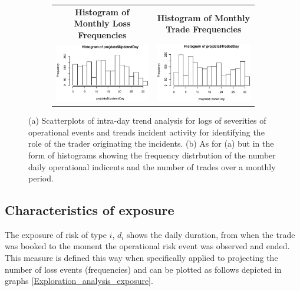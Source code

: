 \documentclass[]{DissertateUSU}
\begin{document}
\begin{figure}
\begin{subfigure}[b]{0.55\textwidth}
   \begin{frame}
      \centering
       \begin{tabular}{cc}
        \textbf{Histogram of Monthly Loss Frequencies} & \textbf{Histogram of Monthly Trade Frequencies} \\
        \includegraphics[width=7.5cm]{UpdatedDayFreq.eps}
         &
         \includegraphics[width=7cm]{TradedDayFreq.eps}
         \end{tabular}
    \end{frame}
   \label{Hist_Loss_Freq}
\end{subfigure}
\caption[Numerical grid display]{(a) Scatterplots of intra-day trend analysis for logs of severities of operational events and trends incident activity for identifying the role of the trader originating the incidents. (b) As for (a) but in the form of histograms showing the frequency distrbution of the number daily operational indicents and the number of trades over a monthly period.} 
\end{figure}

\subsection{Characteristics of exposure}

The exposure of risk of type \(i\), \(d_i\) shows the daily duration,
from when the trade was booked to the moment the operational risk event
was observed and ended. This measure is defined this way when
specifically applied to projecting the number of loss events
(frequencies) and can be plotted as follows depicted in graphs
\ref{Exploration_analysis_exposure}.\medskip
\end{document}
